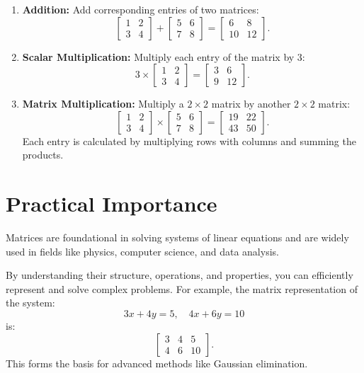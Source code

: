\documentclass{article}
\begin{document}
\begin{enumerate}
  \item \textbf{Addition:}
    Add corresponding entries of two matrices:
    \[
      \begin{bmatrix}
        1 & 2 \\
        3 & 4
      \end{bmatrix} +
      \begin{bmatrix}
        5 & 6 \\
        7 & 8
      \end{bmatrix} =
      \begin{bmatrix}
        6 & 8 \\
        10 & 12
      \end{bmatrix}.
    \]

  \item \textbf{Scalar Multiplication:}
    Multiply each entry of the matrix by 3:
    \[
      3 \times
      \begin{bmatrix}
        1 & 2 \\
        3 & 4
      \end{bmatrix} =
      \begin{bmatrix}
        3 & 6 \\
        9 & 12
      \end{bmatrix}.
    \]

  \item \textbf{Matrix Multiplication:}
    Multiply a $2 \times 2$ matrix by another $2 \times 2$ matrix:
    \[
      \begin{bmatrix}
        1 & 2 \\
        3 & 4
      \end{bmatrix} \times
      \begin{bmatrix}
        5 & 6 \\
        7 & 8
      \end{bmatrix} =
      \begin{bmatrix}
        19 & 22 \\
        43 & 50
      \end{bmatrix}.
    \]
    Each entry is calculated by multiplying rows with columns and summing the products.
\end{enumerate}

\section*{Practical Importance}

Matrices are foundational in solving systems of linear equations and are widely used in fields like physics, computer science, and data analysis.

By understanding their structure, operations, and properties, you can efficiently represent and solve complex problems. For example, the matrix representation of the system:
\[
  3x + 4y = 5, \quad 4x + 6y = 10
\]
is:
\[
  \begin{bmatrix}
    3 & 4 & 5 \\
    4 & 6 & 10
  \end{bmatrix}.
\]
This forms the basis for advanced methods like Gaussian elimination.
\end{document}

